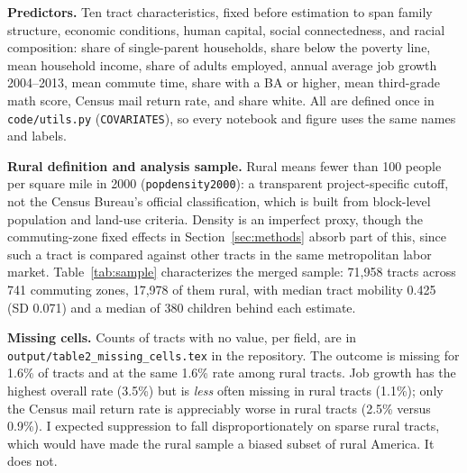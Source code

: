 \documentclass[9pt,twoside]{pnas-new}
\newcommand{\OUT}{../output}
\begin{document}
\noindent\textbf{Predictors.} Ten tract characteristics, fixed before estimation to
span family structure, economic conditions, human capital, social
connectedness, and racial composition: share of single-parent households, share
below the poverty line, mean household income, share of adults employed, annual
average job growth 2004--2013, mean commute time, share with a BA or higher,
mean third-grade math score, Census mail return rate, and share white. All are
defined once in \texttt{code/utils.py} (\texttt{COVARIATES}), so every notebook
and figure uses the same names and labels.

\noindent\textbf{Rural definition and analysis sample.} Rural means fewer than 100
people per square mile in 2000 (\texttt{popdensity2000}): a transparent
project-specific cutoff, not the Census Bureau's official classification, which
is built from block-level population and land-use criteria. Density is an
imperfect proxy, though the commuting-zone fixed effects in
Section~\ref{sec:methods} absorb part of this, since such a tract is compared
against other tracts in the same metropolitan labor market.
Table~\ref{tab:sample} characterizes the merged sample: 71{,}958 tracts across
741 commuting zones, 17{,}978 of them rural, with median tract mobility 0.425
(SD 0.071) and a median of 380 children behind each estimate.

\begin{table}[!htbp]
\centering\footnotesize
\caption{\textbf{Analysis sample.} Merged Opportunity Atlas tracts after the
one-to-one join and the drop of tracts missing mobility or population density.
Mobility is the mean adult household income rank of children whose parents were
at the 25th percentile; the child count is the number of children behind each
tract's estimate.}
\label{tab:sample}

\end{table}

\noindent\textbf{Missing cells.} Counts of tracts with no value, per field, are in
\texttt{output/table2\_missing\_cells.tex} in the repository.
The outcome is missing
for 1.6\% of tracts and at the same 1.6\% rate among rural tracts. Job growth
has the highest overall rate (3.5\%) but is \emph{less} often missing in rural
tracts (1.1\%); only the Census mail return rate is appreciably worse in rural
tracts (2.5\% versus 0.9\%). I expected suppression to fall disproportionately
on sparse rural tracts, which would have made the rural sample a biased subset
of rural America. It does not.
\end{document}
